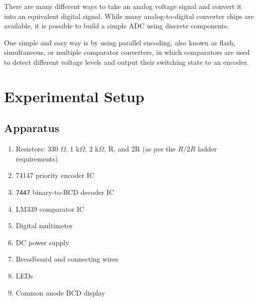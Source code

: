 There are many different ways to take an analog voltage signal and convert it into an equivalent digital signal. While many analog-to-digital converter chips are available, it is possible to build a simple ADC using discrete components.

One simple and easy way is by using parallel encoding, also known as flash, simultaneous, or multiple comparator converters, in which comparators are used to detect different voltage levels and output their switching state to an encoder.


\section{Experimental Setup}

\subsection*{Apparatus}

\begin{enumerate}
    \item Resistors: 330 $\Omega$, 1 k$\Omega$, 2 k$\Omega$, R, and 2R (as per the $R/2R$ ladder requirements)
    \item 74147 priority encoder IC
    \item \verb|7447| binary-to-BCD decoder IC
    \item LM339 comparator IC
    \item Digital multimeter
    \item DC power supply
    \item Breadboard and connecting wires
    \item LEDs
    \item Common anode BCD display
\end{enumerate}

